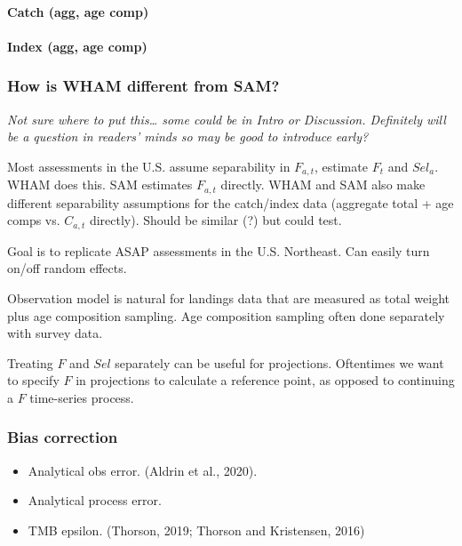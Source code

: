 \documentclass[]{article}
\providecommand{\tightlist}{%
  \setlength{\itemsep}{0pt}\setlength{\parskip}{0pt}}
\let\oldparagraph\paragraph
\renewcommand{\paragraph}[1]{\oldparagraph{#1}\mbox{}}
\begin{document}
\hypertarget{catch-agg-age-comp}{%
\paragraph{Catch (agg, age comp)}\label{catch-agg-age-comp}}

\hypertarget{index-agg-age-comp}{%
\paragraph{Index (agg, age comp)}\label{index-agg-age-comp}}

\hypertarget{how-is-wham-different-from-sam}{%
\subsubsection{How is WHAM different from
SAM?}\label{how-is-wham-different-from-sam}}

\emph{Not sure where to put this\ldots{} some could be in Intro or
Discussion. Definitely will be a question in readers' minds so may be
good to introduce early?}

Most assessments in the U.S. assume separability in \(F_{a,t}\),
estimate \(F_t\) and \(Sel_a\). WHAM does this. SAM estimates
\(F_{a,t}\) directly. WHAM and SAM also make different separability
assumptions for the catch/index data (aggregate total + age comps vs.
\(C_{a,t}\) directly). Should be similar (?) but could test.

Goal is to replicate ASAP assessments in the U.S. Northeast. Can easily
turn on/off random effects.

Observation model is natural for landings data that are measured as
total weight plus age composition sampling. Age composition sampling
often done separately with survey data.

Treating \(F\) and \(Sel\) separately can be useful for projections.
Oftentimes we want to specify \(F\) in projections to calculate a
reference point, as opposed to continuing a \(F\) time-series process.

\hypertarget{bias-correction}{%
\subsubsection{Bias correction}\label{bias-correction}}

\begin{itemize}
\tightlist
\item
  Analytical obs error. (Aldrin et al., 2020).
\item
  Analytical process error.
\item
  TMB epsilon. (Thorson, 2019; Thorson and Kristensen, 2016)
\end{itemize}
\end{document}
